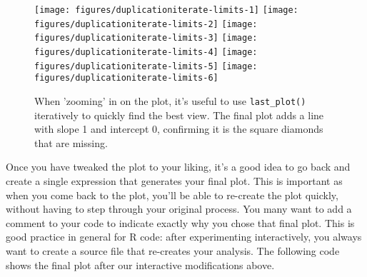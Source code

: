 \begin{Shaded}
\begin{Highlighting}[]
  \NormalTok{)}
\NormalTok{() +}\StringTok{ }\NormalTok{(}\NormalTok{, }\NormalTok{) +}\StringTok{ }\NormalTok{(}\NormalTok{, }\NormalTok{)}
\NormalTok{() +}\StringTok{ }\NormalTok{(}\NormalTok{, }\NormalTok{) +}\StringTok{ }\NormalTok{(}\NormalTok{, }\NormalTok{)}
\NormalTok{() +}\StringTok{ }\NormalTok{(}\NormalTok{, }\NormalTok{) +}\StringTok{ }\NormalTok{(}\NormalTok{, }\NormalTok{)}
\NormalTok{() +}\StringTok{ }\NormalTok{(}\NormalTok{, }\NormalTok{) +}\StringTok{ }\NormalTok{(}\NormalTok{, }\NormalTok{)}
\NormalTok{() +}\StringTok{ }\NormalTok{(} \NormalTok{)}
\end{Highlighting}
\end{Shaded}

\begin{figure}

{\centering \texttt{[image: figures/duplicationiterate-limits-1]} \texttt{[image: figures/duplicationiterate-limits-2]} \texttt{[image: figures/duplicationiterate-limits-3]} \texttt{[image: figures/duplicationiterate-limits-4]} \texttt{[image: figures/duplicationiterate-limits-5]} \texttt{[image: figures/duplicationiterate-limits-6]} 

}

\caption{When 'zooming' in on the plot, it's useful to use \texttt{last\_plot()} iteratively to quickly find the best view. The final plot adds a line with slope 1 and intercept 0, confirming it is the square diamonds that are missing.\label{fig:iterate-limits}}
\end{figure}

Once you have tweaked the plot to your liking, it's a good idea to go
back and create a single expression that generates your final plot. This
is important as when you come back to the plot, you'll be able to
re-create the plot quickly, without having to step through your original
process. You many want to add a comment to your code to indicate exactly
why you chose that final plot. This is good practice in general for R
code: after experimenting interactively, you always want to create a
source file that re-creates your analysis. The following code shows the
final plot after our interactive modifications above.

